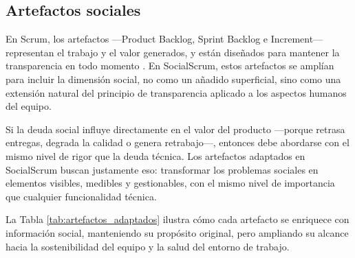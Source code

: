 \subsection{Artefactos sociales}

En Scrum, los artefactos —Product Backlog, Sprint Backlog e Increment— representan el trabajo y el valor generados, y están diseñados para mantener la transparencia en todo momento \cite{schwaber2020scrum}. En SocialScrum, estos artefactos se amplían para incluir la dimensión social, no como un añadido superficial, sino como una extensión natural del principio de transparencia aplicado a los aspectos humanos del equipo.

Si la deuda social influye directamente en el valor del producto —porque retrasa entregas, degrada la calidad o genera retrabajo—, entonces debe abordarse con el mismo nivel de rigor que la deuda técnica. Los artefactos adaptados en SocialScrum buscan justamente eso: transformar los problemas sociales en elementos visibles, medibles y gestionables, con el mismo nivel de importancia que cualquier funcionalidad técnica.

La Tabla \ref{tab:artefactos_adaptados} ilustra cómo cada artefacto se enriquece con información social, manteniendo su propósito original, pero ampliando su alcance hacia la sostenibilidad del equipo y la salud del entorno de trabajo.

\begingroup
\scriptsize
\setlength{\LTleft}{0pt} %
\setlength{\LTright}{0pt} %
\setlength{\tabcolsep}{4pt} %
\renewcommand{\arraystretch}{1.4}

